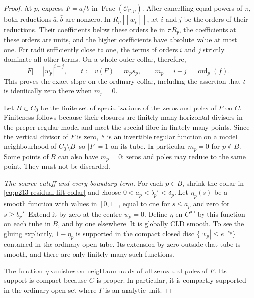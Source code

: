 \begin{proof}
At \(p\), express \(F=a/b\) in
\(\operatorname{Frac}(\mathcal O_{\mathcal C,p})\).
After cancelling equal powers of \(\pi\), both reductions
\(\bar a,\bar b\) are nonzero. In \(R_p[[w_p]]\), let \(i\) and
\(j\) be the orders of their reductions. Their coefficients below
these orders lie in \(\pi R_p\), the coefficients at these
orders are units, and the higher coefficients have absolute
value at most one. For radii sufficiently close to one, the
terms of orders \(i\) and \(j\) strictly dominate all other
terms. On a whole outer collar, therefore,
\begin{equation}
\label{eq:p213-residual-lift-collar}
 |F|=|w_p|^{i-j},
 \qquad
 t:=v(F)=m_ps_p,\qquad
 m_p=i-j=\operatorname{ord}_p(f).
\end{equation}
This proves the exact slope on the ordinary collar, including
the assertion that \(t\) is identically zero there when \(m_p=0\).

Let \(B\subset C_0\) be the finite set of specializations of the
zeros and poles of \(F\) on \(C\). Finiteness follows because
their closures are finitely many horizontal divisors in the
proper regular model and meet the special fibre in finitely
many points. Since the vertical divisor of \(F\) is zero,
\(F\) is an invertible regular function on a model neighbourhood
of \(C_0\setminus B\), so \(|F|=1\) on its tube.
In particular \(m_p=0\) for \(p\notin B\).
Some points of \(B\) can also have \(m_p=0\): zeros and poles
may reduce to the same point. They must not be discarded.

\emph{The source cutoff and every boundary term.}
For each \(p\in B\), shrink the collar in
\eqref{eq:p213-residual-lift-collar} and choose
\(0<a_p<b_p'<\delta_p\). Let
\(\eta_p(s)\) be a smooth function with values in \([0,1]\),
equal to one for \(s\leq a_p\) and zero for \(s\geq b_p'\).
Extend it by zero at the centre \(w_p=0\). Define \(\eta\) on
\(C^{\mathrm{an}}\) by this function on each tube in \(B\), and
by one elsewhere. It is globally CLD smooth. To see the gluing
explicitly, \(1-\eta_p\) is supported in the compact closed
disc \(\{|w_p|\leq e^{-a_p}\}\) contained in the ordinary open
tube. Its extension by zero outside that tube is smooth, and
there are only finitely many such functions.

The function \(\eta\) vanishes on neighbourhoods of all zeros
and poles of \(F\). Its support is compact because \(C\) is
proper. In particular, it is compactly supported in the
ordinary open set where \(F\) is an analytic unit.


\end{proof}
